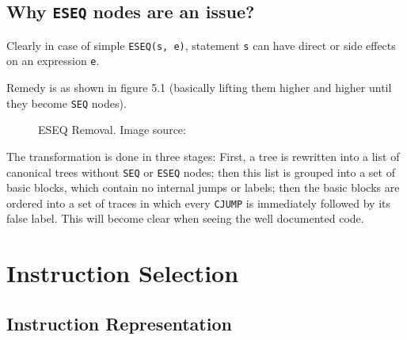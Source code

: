 \hypertarget{why-eseq-nodes-are-an-issue}{%
\subsection{\texorpdfstring{Why
\texttt{ESEQ}
nodes are an
issue?}{Why  nodes are an issue?}}\label{why-eseq-nodes-are-an-issue}}

Clearly in case of simple
\texttt{ESEQ(s, e)},
statement
\texttt{s} can
have direct or side effects on an expression
\texttt{e}.

Remedy is as shown in figure 5.1 (basically lifting them higher and
higher until they become
\texttt{SEQ}
nodes).

\begin{figure}
\centering
{}
\caption{ESEQ Removal. Image source: \cite{tigerbook}}
\end{figure}

The transformation is done in three stages: First, a tree is rewritten
into a list of canonical trees without
\texttt{SEQ} or
\texttt{ESEQ}
nodes; then this list is grouped into a set of basic blocks, which
contain no internal jumps or labels; then the basic blocks are ordered
into a set of traces in which every
\texttt{CJUMP}
is immediately followed by its false label. This will become clear when
seeing the well documented code.

\section{Instruction Selection}


\hypertarget{instruction-representation}{%
\subsection{Instruction
Representation}\label{instruction-representation}}

